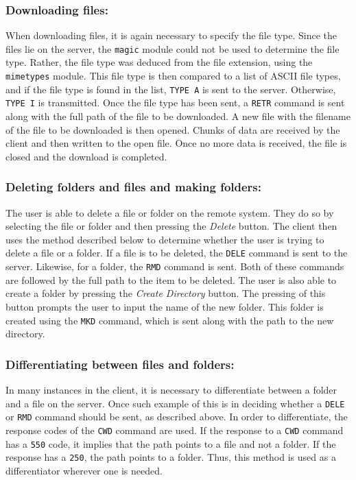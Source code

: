 \documentclass[10pt,twocolumn]{witseiepaper}
\begin{document}
\subsubsection*{Downloading files:}
When downloading files, it is again necessary to specify the file type. Since the files lie on the server, the \texttt{magic} module could not be used to determine the file type. Rather, the file type was deduced from the file extension, using the \texttt{mimetypes} module. This file type is then compared to a list of ASCII file types, and if the file type is found in the list, \texttt{TYPE A} is sent to the server. Otherwise, \texttt{TYPE I} is transmitted. Once the file type has been sent, a \texttt{RETR} command is sent along with the full path of the file to be downloaded. A new file with the filename of the file to be downloaded is then opened. Chunks of data are received by the client and then written to the open file. Once no more data is received, the file is closed and the download is completed.

\subsubsection*{Deleting folders and files and making folders:}
The user is able to delete a file or folder on the remote system. They do so by selecting the file or folder and then pressing the \textit{Delete} button. The client then uses the method described below to determine whether the user is trying to delete a file or a folder. If a file is to be deleted, the \texttt{DELE} command is sent to the server. Likewise, for a folder, the \texttt{RMD} command is sent. Both of these commands are followed by the full path to the item to be deleted. The user is also able to create a folder by pressing the \textit{Create Directory} button. The pressing of this button prompts the user to input the name of the new folder. This folder is created using the \texttt{MKD} command, which is sent along with the path to the new directory.

\subsubsection*{Differentiating between files and folders:}
In many instances in the client, it is necessary to differentiate between a folder and a file on the server. Once such example of this is in deciding whether a \texttt{DELE} or \texttt{RMD} command should be sent, as described above. In order to differentiate, the response codes of the \texttt{CWD} command are used. If the response to a \texttt{CWD} command has a \texttt{550} code, it implies that the path points to a file and not a folder. If the response has a \texttt{250}, the path points to a folder. Thus, this method is used as a differentiator wherever one is needed.
\end{document}
